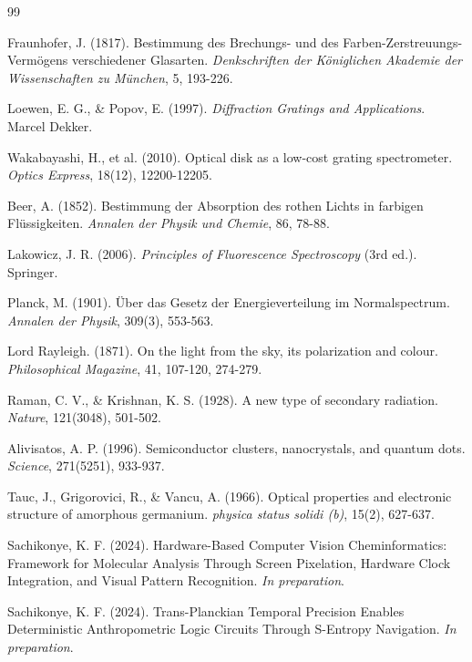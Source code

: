 \documentclass[12pt,a4paper]{article}
\begin{document}

\begin{thebibliography}{99}

Fraunhofer, J. (1817). Bestimmung des Brechungs- und des Farben-Zerstreuungs-Vermögens verschiedener Glasarten. \textit{Denkschriften der Königlichen Akademie der Wissenschaften zu München}, 5, 193-226.

Loewen, E. G., \& Popov, E. (1997). \textit{Diffraction Gratings and Applications}. Marcel Dekker.

Wakabayashi, H., et al. (2010). Optical disk as a low-cost grating spectrometer. \textit{Optics Express}, 18(12), 12200-12205.

Beer, A. (1852). Bestimmung der Absorption des rothen Lichts in farbigen Flüssigkeiten. \textit{Annalen der Physik und Chemie}, 86, 78-88.

Lakowicz, J. R. (2006). \textit{Principles of Fluorescence Spectroscopy} (3rd ed.). Springer.

Planck, M. (1901). Über das Gesetz der Energieverteilung im Normalspectrum. \textit{Annalen der Physik}, 309(3), 553-563.

Lord Rayleigh. (1871). On the light from the sky, its polarization and colour. \textit{Philosophical Magazine}, 41, 107-120, 274-279.

Raman, C. V., & Krishnan, K. S. (1928). A new type of secondary radiation. \textit{Nature}, 121(3048), 501-502.

Alivisatos, A. P. (1996). Semiconductor clusters, nanocrystals, and quantum dots. \textit{Science}, 271(5251), 933-937.

Tauc, J., Grigorovici, R., & Vancu, A. (1966). Optical properties and electronic structure of amorphous germanium. \textit{physica status solidi (b)}, 15(2), 627-637.

Sachikonye, K. F. (2024). Hardware-Based Computer Vision Cheminformatics: Framework for Molecular Analysis Through Screen Pixelation, Hardware Clock Integration, and Visual Pattern Recognition. \textit{In preparation}.

Sachikonye, K. F. (2024). Trans-Planckian Temporal Precision Enables Deterministic Anthropometric Logic Circuits Through S-Entropy Navigation. \textit{In preparation}.

\end{thebibliography}
\end{document}
